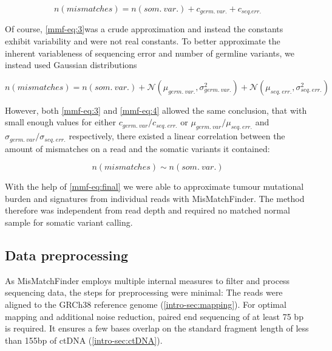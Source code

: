 \begin{equation}
n(mismatches) = n(som.~var.) + c_{germ.~var.} + c_{seq. err.}
\label{mmf-eq:3}
\end{equation}
\myequation[\ref{mmf-eq:3}]{MisMatchFinder: germline variants}

Of course, \autoref{mmf-eq:3}was a crude approximation and instead the constants exhibit variability and were not real constants. To better approximate the inherent variableness of sequencing error and number of germline variants, we instead used Gaussian distributions 

\begin{equation}
n(mismatches) = n(som.~var.) + \mathcal{N}(\mu_{germ.~var.}, \sigma_{germ.~var.}^{2}) + \mathcal{N}(\mu_{seq.~err.}, \sigma_{seq.~err.}^{2})
\label{mmf-eq:4}
\end{equation}
\myequation[\ref{mmf-eq:4}]{MisMatchFinder: number of mismatches with distributions}

However, both \autoref{mmf-eq:3} and \ref{mmf-eq:4} allowed the same conclusion, that with small enough values for either $c_{germ.~var}/c_{seq.~err.}$ or $\mu_{germ.~var}/\mu_{seq.~err.}$ and $\sigma_{germ.~var}/\sigma_{seq.~err.}$ respectively, there existed a linear correlation between the amount of mismatches on a read and the somatic variants it contained:

\begin{equation}
n(mismatches) \sim n(som.~var.)
\label{mmf-eq:final}
\end{equation}
\myequation[\ref{mmf-eq:final}]{MisMatchFinder: number of mismatches correlation with somatic variants}

With the help of \autoref{mmf-eq:final} we were able to approximate tumour mutational burden and signatures from individual reads with MisMatchFinder. The method therefore was independent from read depth and required no matched normal sample for somatic variant calling.

\subsection{Data preprocessing}
As MisMatchFinder employs multiple internal measures to filter and process sequencing data, the steps for preprocessing were minimal: The reads were  aligned to the GRCh38 reference genome (\autoref{intro-sec:mapping}). For optimal mapping and additional noise reduction, paired end sequencing of at least 75 bp is required. It ensures a few bases overlap on the standard fragment length of less than 155bp of ctDNA (\autoref{intro-sec:ctDNA}). 

